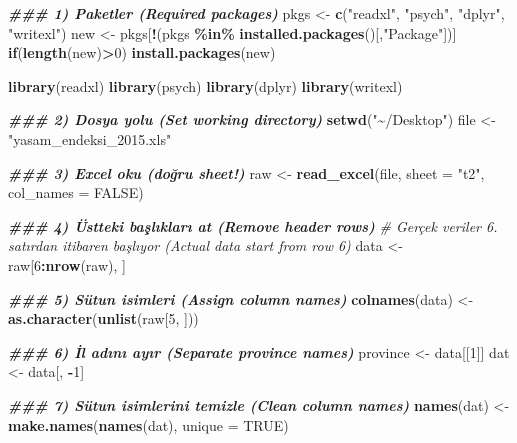 \documentclass[
]{article}
\newenvironment{Shaded}{\begin{snugshade}}{\end{snugshade}}
\newcommand{\AttributeTok}[1]{\textcolor[rgb]{0.13,0.29,0.53}{#1}}
\newcommand{\CommentTok}[1]{\textcolor[rgb]{0.56,0.35,0.01}{\textit{#1}}}
\newcommand{\ConstantTok}[1]{\textcolor[rgb]{0.56,0.35,0.01}{#1}}
\newcommand{\ControlFlowTok}[1]{\textcolor[rgb]{0.13,0.29,0.53}{\textbf{#1}}}
\newcommand{\DecValTok}[1]{\textcolor[rgb]{0.00,0.00,0.81}{#1}}
\newcommand{\DocumentationTok}[1]{\textcolor[rgb]{0.56,0.35,0.01}{\textbf{\textit{#1}}}}
\newcommand{\FunctionTok}[1]{\textcolor[rgb]{0.13,0.29,0.53}{\textbf{#1}}}
\newcommand{\NormalTok}[1]{#1}
\newcommand{\OtherTok}[1]{\textcolor[rgb]{0.56,0.35,0.01}{#1}}
\newcommand{\SpecialCharTok}[1]{\textcolor[rgb]{0.81,0.36,0.00}{\textbf{#1}}}
\newcommand{\StringTok}[1]{\textcolor[rgb]{0.31,0.60,0.02}{#1}}
\begin{document}
\begin{Shaded}
\begin{Highlighting}[]
\DocumentationTok{\#\#\# 1) Paketler (Required packages)}
\NormalTok{pkgs }\OtherTok{\textless{}{-}} \FunctionTok{c}\NormalTok{(}\StringTok{"readxl"}\NormalTok{, }\StringTok{"psych"}\NormalTok{, }\StringTok{"dplyr"}\NormalTok{, }\StringTok{"writexl"}\NormalTok{)}
\NormalTok{new }\OtherTok{\textless{}{-}}\NormalTok{ pkgs[}\SpecialCharTok{!}\NormalTok{(pkgs }\SpecialCharTok{\%in\%} \FunctionTok{installed.packages}\NormalTok{()[,}\StringTok{"Package"}\NormalTok{])]}
\ControlFlowTok{if}\NormalTok{(}\FunctionTok{length}\NormalTok{(new)}\SpecialCharTok{\textgreater{}}\DecValTok{0}\NormalTok{) }\FunctionTok{install.packages}\NormalTok{(new)}

\FunctionTok{library}\NormalTok{(readxl)}
\FunctionTok{library}\NormalTok{(psych)}
\FunctionTok{library}\NormalTok{(dplyr)}
\FunctionTok{library}\NormalTok{(writexl)}

\DocumentationTok{\#\#\# 2) Dosya yolu (Set working directory)}
\FunctionTok{setwd}\NormalTok{(}\StringTok{"\textasciitilde{}/Desktop"}\NormalTok{)}
\NormalTok{file }\OtherTok{\textless{}{-}} \StringTok{"yasam\_endeksi\_2015.xls"}

\DocumentationTok{\#\#\# 3) Excel oku (doğru sheet!)}
\NormalTok{raw }\OtherTok{\textless{}{-}} \FunctionTok{read\_excel}\NormalTok{(file, }\AttributeTok{sheet =} \StringTok{"t2"}\NormalTok{, }\AttributeTok{col\_names =} \ConstantTok{FALSE}\NormalTok{)}

\DocumentationTok{\#\#\# 4) Üstteki başlıkları at (Remove header rows)}
\CommentTok{\# Gerçek veriler 6. satırdan itibaren başlıyor (Actual data start from row 6)}
\NormalTok{data }\OtherTok{\textless{}{-}}\NormalTok{ raw[}\DecValTok{6}\SpecialCharTok{:}\FunctionTok{nrow}\NormalTok{(raw), ]}

\DocumentationTok{\#\#\# 5) Sütun isimleri (Assign column names)}
\FunctionTok{colnames}\NormalTok{(data) }\OtherTok{\textless{}{-}} \FunctionTok{as.character}\NormalTok{(}\FunctionTok{unlist}\NormalTok{(raw[}\DecValTok{5}\NormalTok{, ]))}

\DocumentationTok{\#\#\# 6) İl adını ayır (Separate province names)}
\NormalTok{province }\OtherTok{\textless{}{-}}\NormalTok{ data[[}\DecValTok{1}\NormalTok{]]}
\NormalTok{dat }\OtherTok{\textless{}{-}}\NormalTok{ data[, }\SpecialCharTok{{-}}\DecValTok{1}\NormalTok{]}

\DocumentationTok{\#\#\# 7) Sütun isimlerini temizle (Clean column names)}
\FunctionTok{names}\NormalTok{(dat) }\OtherTok{\textless{}{-}} \FunctionTok{make.names}\NormalTok{(}\FunctionTok{names}\NormalTok{(dat), }\AttributeTok{unique =} \ConstantTok{TRUE}\NormalTok{)}


\end{Highlighting}
\end{Shaded}
\end{document}
